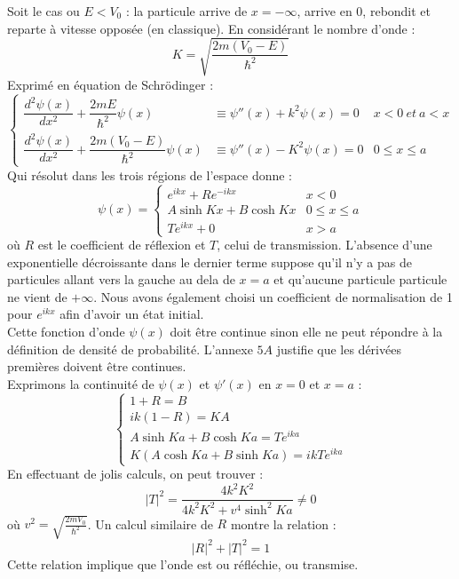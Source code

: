 \documentclass	[11pt, a4paper, openany]{book}
\begin{document}
Soit le cas ou $E < V_0$ : la particule arrive de $x = -\infty$, arrive en 0, rebondit et reparte à vitesse opposée (en classique). En considérant le nombre d'onde :
\begin{equation}
K = \sqrt{\frac{2m(V_0 - E)}{\hbar^2}}
\end{equation}
Exprimé en équation de Schrödinger :
\begin{equation}
\left\{\begin{array}{lll}
\dfrac{d^2\psi(x)}{dx^2} + \dfrac{2mE}{\hbar^2}\psi(x)  & \equiv \psi''(x) + k^2\psi(x) = 0 & x<0\ et\ a < x\\
\dfrac{d^2\psi(x)}{dx^2} + \dfrac{2m(V_0-E)}{\hbar^2}\psi(x)  & \equiv \psi''(x) -K^2\psi(x) = 0 & 0 \leq x \leq a
\end{array}\right.
\end{equation}
Qui résolut dans les trois régions de l'espace donne : 
\begin{equation}
\psi(x) = \left\{\begin{array}{ll}
e^{ikx} + Re^{-ikx} & x<0\\
A\sinh Kx + B\cosh Kx & 0\leq x \leq a\\
Te^{ikx} + 0 & x > a
\end{array}\right.
\end{equation}
où $R$ est le coefficient de réflexion et $T$, celui de transmission. L'absence d'une exponentielle décroissante dans le dernier terme suppose qu'il n'y a pas de particules allant vers la gauche au dela de $x=a$ et qu'aucune particule particule ne vient de $+\infty$. Nous avons également choisi un coefficient de normalisation de 1 pour $e^{ikx}$ afin d'avoir un état initial.\\

Cette fonction d'onde $\psi(x)$ doit être continue sinon elle ne peut répondre à la définition de densité de probabilité. L'annexe $5A$ justifie que les dérivées premières doivent être continues.\\
Exprimons la continuité de $\psi(x)$ et $\psi'(x)$ en $x=0$ et $x=a$ :
\begin{equation}
\left\{\begin{array}{l}
1+R = B\\
ik(1-R) = KA\\
A\sinh Ka + B\cosh Ka = Te^{ika}\\
K(A\cosh Ka + B\sinh Ka) = ikTe^{ika}
\end{array}\right.
\end{equation}
En effectuant de jolis calculs, on peut trouver :
\begin{equation}
|T|^2 = \dfrac{4k^2K^2}{4k^2K^2 + v^4\sinh^2 Ka} \neq 0
\end{equation}
où $v^2 = \sqrt{\frac{2mV_0}{\hbar^2}}$. Un calcul similaire de $R$ montre la relation :
\begin{equation}
|R|^2 + |T|^2 = 1
\end{equation}
Cette relation implique que l'onde est ou réfléchie, ou transmise.\\
\end{document}
